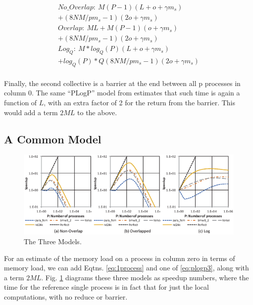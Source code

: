 \begin{eqnarray}\label{eq:plogp3}
No\_Overlap:~M(P-1)(L+o+\gamma m_s)\\+(8NM/pm_s-1)(2o+\gamma m_s)\\
Overlap:~ML+M(P-1)(o+\gamma m_s)\\+(8NM/pm_s-1)(2o+\gamma m_s) \\
Log_Q:~M*log_Q(P)(L+o+\gamma m_s)\\+log_Q(P)*Q(8NM/pm_s-1)(2o+\gamma m_s)\\
\end{eqnarray}


Finally, the second collective is a barrier at the end between all p processes in column 0. The same ``PLogP'' model from \cite{techbib:Pjesivac-Grbovic:2007:PAM:1265235.1265248} estimates that such time is again a function of $L$, with an extra factor of 2 for the return from the barrier. This would add a term $2ML$ to the above.



\subsection{A Common Model}

\begin{figure}\begin{centering}
\includegraphics[scale=0.85]{figures/spmv-analytic-model.eps}
\caption{The Three Models.}
\label{fig:spmv-analytic-model}
\end{centering}\end{figure}

For an estimate of the memory load on a process in column zero in terms of memory load, we can add Eqtns. \ref{eq:1process} and one of \ref{eq:plogp3}, along with a term $2ML$. Fig. \ref{fig:spmv-analytic-model} diagrams these three models as speedup numbers, where the time for the reference single process is in fact that for just the local computations, with no reduce or barrier.

